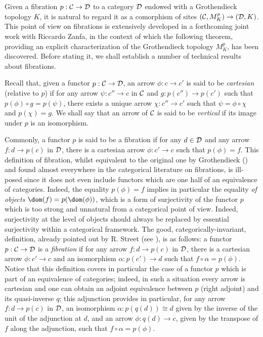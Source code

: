 \documentclass[a4paper,12pt]{article}
\begin{document}
Given a fibration $p:{\cal C}\to {\cal D}$ to a category $\cal D$ endowed with a Grothendieck topology $K$, it is natural to regard it as a comorphism of sites $({\cal C}, M^{p}_{K})\to ({\cal D}, K)$. This point of view on fibrations is extensively developed in a forthcoming joint work with Riccardo Zanfa, in the context of which the following theorem, providing an explicit characterization of the Grothendieck topology $M^{p}_{K}$, has been discovered. Before stating it, we shall establish a number of technical results about fibrations. 

Recall that, given a functor $p:{\cal C}\to {\cal D}$, an arrow $\phi:c\to c'$ is said to be \emph{cartesian} (relative to $p$) if for any arrow $\psi:c'' \to c$ in $\cal C$ and $g:p(c'')\to p(c')$ such that $p(\phi)\circ g=p(\psi)$, there exists a unique arrow $\chi:c''\to c'$ such that $\psi=\phi\circ \chi$ and $p(\chi)=g$. We shall say that an arrow of $\cal C$ is said to be \emph{vertical} if its image under $p$ is an isomorphism.

Commonly, a functor $p$ is said to be a fibration if for any $d\in {\cal D}$ and any arrow $f:d\to p(c)$ in $\cal D$, there is a cartesian arrow $\phi:c'\to c$ such that $p(\phi)=f$. This definition of fibration, whilst equivalent to the original one by Grothendieck (\cite{SGA1}) and found almost everywhere in the categorical literature on fibrations, is ill-posed since it does not even include functors which are one half of an equivalence of categories. Indeed, the equality $p(\phi)=f$ implies in particular the equality \emph{of objects} $\dom(f)=p(\dom(\phi))$, which is a form of surjectivity of the functor $p$ which is too strong and unnatural from a categorical point of view. Indeed, surjectivity at the level of objects should always be replaced by essential surjectivity within a categorical framework. The good, categorically-invariant, definition, already pointed out by R. Street (see \cite{nLabstreetfibration}), is as follows: a functor $p:{\cal C}\to {\cal D}$ is a \emph{fibration} if for any arrow $f:d\to p(c)$ in $\cal D$, there is a cartesian arrow $\phi:c'\to c$ and an isomorphism $\alpha:p(c')\to d$ such that $f\circ \alpha=p(\phi)$. Notice that this definition covers in particular the case of a functor $p$ which is part of an equivalence of categories; indeed, in such a situation every arrow is cartesian and one can obtain an adjoint equivalence between $p$ (right adjoint) and its quasi-inverse $q$; this adjunction provides in particular, for any arrow $f:d\to p(c)$ in $\cal D$, an isomorphism $\alpha:p(q(d))\cong d$ given by the inverse of the unit of the adjunction at $d$, and an arrow $\phi:q(d)\to c$, given by the transpose of $f$ along the adjunction, such that $f\circ \alpha =p(\phi)$.  
\end{document}
